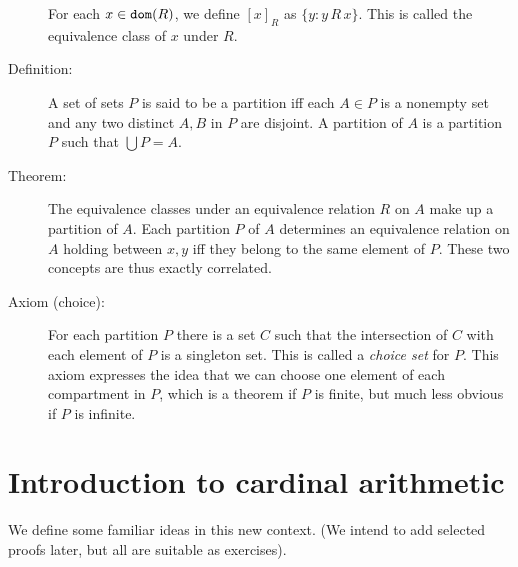 \documentclass[12pt]{article}
\begin{document}
\begin{description}
For each $x \in {\tt dom}(R)$, we define $[x]_R$ as $\{y:y \, R\,x\}$.  This is called the equivalence class of $x$ under $R$.

\item[Definition:]  A set of sets $P$ is said to be a partition iff each $A \in P$ is a nonempty set and any two distinct $A,B$ in $P$ are disjoint.  A partition of $A$ is a partition $P$ such that $\bigcup P=A$.

\item[Theorem:]  The equivalence classes under an equivalence relation $R$ on $A$ make up a partition of $A$.
Each partition $P$ of $A$ determines an equivalence relation on $A$ holding between $x,y$ iff they belong to the same element of $P$.  These two concepts are thus exactly correlated.

\item[Axiom (choice):]  For each partition $P$ there is a set $C$ such that the intersection of $C$ with each element of $P$ is a singleton set.  This is called a {\em choice set\/} for $P$.  This axiom expresses the idea that we can choose one element of each compartment in $P$, which is a theorem if $P$ is finite, but much less obvious if $P$ is infinite.

\end{description}

\newpage

\section{Introduction to cardinal arithmetic}

We define some familiar ideas in this new context.  (We intend to add selected proofs later, but all are suitable as exercises).
\end{document}
